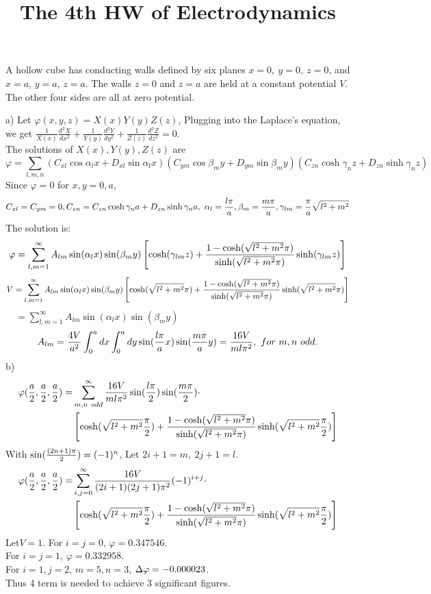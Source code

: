 \documentclass[UTF8,9pt]{ctexart}
\title{The 4th HW of Electrodynamics}
\begin{document}
 
\maketitle
{}
A hollow cube has conducting walls defined by six planes $x=0,\ y=0,\ z=0$, and $x=a$, $y=a$, $z=a$. The walls $z=0$ and $z=a$ are held at a constant potential $V$. The other four sides are all at zero potential.

a) Let $\varphi(x, y, z)=X(x) Y(y) Z(z)$, Plugging into the Laplace’s equation, we get $\frac{1}{X(x)} \frac{d^{2} X}{d x^{2}}+\frac{1}{Y(y)} \frac{d^{2} Y}{d y^{2}}+\frac{1}{Z(z)} \frac{d^{2} Z}{d z^{2}}=0$.\\
The solutions of $X(x),Y(y),Z(z)$ are 
$$\varphi = \sum_{l, m, n}(C_{x l} \cos \alpha_{l} x+D_{x l} \sin \alpha_{l} x)(C_{y m} \cos \beta_{m} y+D_{y m} \sin \beta_{m} y)(C_{z n} \cosh \gamma_{n} z+D_{z n} \sinh \gamma_{n} z)$$
Since $\varphi=0$ for $x,y=0,a$, 
$$C_{x l}=C_{y m}=0,C_{zn}=C_{zn}\cosh \gamma_na+D_{zn}\sinh\gamma_na,\ \alpha_l=\frac{l \pi}{a}, \beta_{m}=\frac{m \pi}{a}, \gamma_{l m}=\frac{\pi}{a} \sqrt{l^2+m^2}$$
The solution is: 
$$\varphi=\sum_{l, m=1}^{\infty} A_{l m} \sin (\alpha_{l} x) \sin (\beta_{m} y) \left[\cosh (\gamma_{lm} z)+\frac{1-\cosh(\sqrt{l^2+m^2}\pi)}{\sinh(\sqrt{l^2+m^2}\pi)}\sinh(\gamma_{lm} z)\right]$$
$$V=\sum_{l, m=1}^{\infty} A_{l m} \sin (\alpha_{l} x) \sin (\beta_{m} y) \left[\cosh (\sqrt{l^2+m^2}\pi)+\frac{1-\cosh(\sqrt{l^2+m^2}\pi)}{\sinh(\sqrt{l^2+m^2}\pi)}\sinh(\sqrt{l^2+m^2}\pi)\right]$$
$\displaystyle \quad=\sum_{l, m=1}^{\infty} A_{l m} \sin (\alpha_{l} x) \sin (\beta_{m} y)$
$$A_{l m}=\frac{4 V}{a^2} \int_{0}^{a} d x \int_{0}^{a} d y \sin (\frac{l\pi}{a} x) \sin(\frac{m\pi}{a} y) = \frac{16V}{ml\pi^2}, \ for\ m,n\ odd.$$
b)
$$\begin{aligned} 
    \displaystyle \varphi(\frac{a}{2},\frac{a}{2},\frac{a}{2}) =&\displaystyle  \sum_{m,n\ odd}^{\infty} \frac{16V}{ml\pi^2} \sin (\frac{l\pi}{2}) \sin (\frac{m\pi}{2})\cdot\\
    &\displaystyle  \left[\cosh (\sqrt{l^2+m^2}\frac{\pi}{2})+\frac{1-\cosh(\sqrt{l^2+m^2}\pi)}{\sinh(\sqrt{l^2+m^2}\pi)}\sinh(\sqrt{l^2+m^2}\frac{\pi}{2})\right]
 \end{aligned}$$
With $\sin(\frac{(2n+1)\pi}{2})=(-1)^n$, Let $2i+1=m,\ 2j+1=l.$
$$\begin{aligned} 
    \displaystyle \varphi(\frac{a}{2},\frac{a}{2},\frac{a}{2}) =&\displaystyle  \sum_{i,j=0}^{\infty} \frac{16V}{(2i+1)(2j+1)\pi^2} (-1)^{i+j}\cdot\\
    &\displaystyle  \left[\cosh (\sqrt{l^2+m^2}\frac{\pi}{2})+\frac{1-\cosh(\sqrt{l^2+m^2}\pi)}{\sinh(\sqrt{l^2+m^2}\pi)}\sinh(\sqrt{l^2+m^2}\frac{\pi}{2})\right]
 \end{aligned}$$
Let$V=1$. For $i=j=0$, $\varphi = 0.347546$.\\
For $i=j=1$, $\varphi = 0.332958$.\\
For $i=1,j=2$, $m=5,n=3$, $\Delta\varphi = -0.000023$. \\
Thus 4 term is needed to achieve 3 significant figures.
\end{document}
